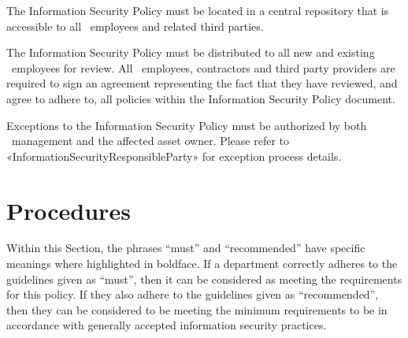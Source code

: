 \documentclass[sec]{policy}
\begin{document}
		The Information Security Policy must be located in a central repository that is accessible to all \theOrganization\ employees and related third parties.
		
		The Information Security Policy must be distributed to all new and existing \theOrganization\ employees for review.  All \theOrganization\ employees, contractors and third party providers are required to sign an agreement representing the fact that they have reviewed, and agree to adhere to, all policies within the Information Security Policy document.
		
		Exceptions to the Information Security Policy must be authorized by both \theOrganization\ management and the affected asset owner.  Please refer to «InformationSecurityResponsibleParty» for exception process details.
		
		\section{Procedures}
		
			Within this Section, the phrases “must” and “recommended” have specific meanings where highlighted in boldface. If a department correctly adheres to the guidelines given as “must”, then it can be considered as meeting the requirements for this policy. If they also adhere to the guidelines given as “recommended”, then they can be considered to be meeting the minimum requirements to be in accordance with generally accepted information security practices.
			
\end{document}
